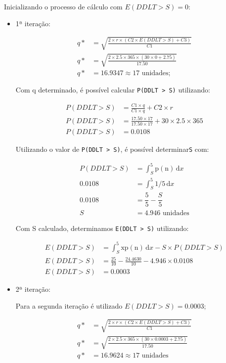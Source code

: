 Inicializando o processo de cálculo com $E(DDLT > S) = 0$:

\begin{itemize}
\item 1ª iteração:

	\begin{align*}	
	q*&=\sqrt{\frac{2 \times r \times (C2 \times E(DDLT > S) + C3)}{C1}}\\
	q*&=\sqrt{\frac{2 \times 2.5 \times 365 \times (30 \times 0 + 2.75)}{17.50}}\\
	q*&=16.9347 \approx 17 \text{ unidades};
	\end{align*}

	Com q determinado, é possível calcular \texttt{P(DDLT > S)} utilizando:

	\begin{align*}	
	P(DDLT > S)&=\frac{C1 \times q}{C1 \times q}+C2 \times r\\
	P(DDLT > S)&=\frac{17.50 \times 17}{17.50 \times 17}+30 \times 2.5 \times
	365\\
	P(DDLT > S)&=0.0108
	\end{align*}

	Utilizando o valor de \texttt{P(DDLT > S)}, é possível determinar\texttt{S} com:
	
	\begin{align*}	
	P(DDLT > S)&=\int_S^5 \mathrm{p(n)}\,\mathrm{d}x\\
	0.0108     &=\int_S^5 \mathrm{1/5}\,\mathrm{d}x\\
	0.0108     &=\dfrac{5}{5} - \dfrac{S}{5}\\
	S          &=4.946 \text{ unidades}
	\end{align*}

	Com S calculado, determinamos \texttt{E(DDLT > S)} utilizando:
	
	\begin{align*}	
	E(DDLT > S)&=\int_S^5 \mathrm{xp(n)}\,\mathrm{d}x - S \times P(DDLT > S)\\
	E(DDLT > S)&=\frac{25}{10} - \frac{24.4630}{10} - 4.946 \times 0.0108\\
	E(DDLT > S)&= 0.0003
	\end{align*}


\item 2ª iteração:
	
	Para a segunda iteração é utilizado $E(DDLT > S) = 0.0003$;

	\begin{align*}	
	q*&=\sqrt{\frac{2 \times r \times (C2 \times E(DDLT > S) + C3)}{C1}}\\
	q*&=\sqrt{\frac{2 \times 2.5 \times 365 \times (30 \times 0.0003
	+ 2.75)}{17.50}}\\
	q*&=16.9624 \approx 17 \text{ unidades}
	\end{align*}


\end{itemize}
